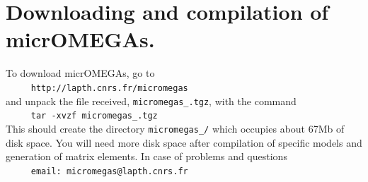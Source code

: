 \documentclass[12pt,a4paper]{article}
\begin{document}
\section{Downloading and compilation of micrOMEGAs.}
To   download  micrOMEGAs, go to    \\  
\verb|     http://lapth.cnrs.fr/micromegas|\\
and unpack the file received, \verb|micromegas_|\VERSION\verb|.tgz|, with the command\\
\verb|     tar -xvzf micromegas_|\VERSION\verb|.tgz|\\
This should create the directory \verb|micromegas_|\VERSION\verb|/| which occupies about 67Mb of disk space. You will need more disk space after compilation of
specific models and generation of matrix elements.
In case of problems and questions\\
\verb|     email: micromegas@lapth.cnrs.fr|\\
\end{document}
